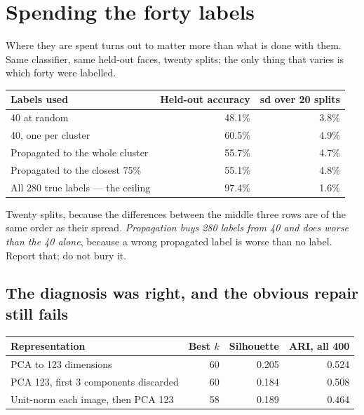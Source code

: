 \documentclass[11pt,a4paper]{article}
\begin{document}
\section{Spending the forty labels}

Where they are spent turns out to matter more than what is done with them. Same
classifier, same held-out faces, twenty splits; the only thing that varies is
which forty were labelled.

\begin{center}
\small
\begin{tabular}{lrr}
\toprule
\textbf{Labels used} & \textbf{Held-out accuracy} & \textbf{sd over 20 splits} \\
\midrule
40 at random                        & 48.1\% & 3.8\% \\
40, one per cluster                 & 60.5\% & 4.9\% \\
Propagated to the whole cluster     & 55.7\% & 4.7\% \\
Propagated to the closest 75\%      & 55.1\% & 4.8\% \\
All 280 true labels --- the ceiling & 97.4\% & 1.6\% \\
\bottomrule
\end{tabular}
\end{center}

Twenty splits, because the differences between the middle three rows are of the
same order as their spread. \emph{Propagation buys 280 labels from 40 and does
worse than the 40 alone}, because a wrong propagated label is worse than no
label. Report that; do not bury it.

\subsection{The diagnosis was right, and the obvious repair still fails}

\begin{center}
\small
\begin{tabular}{lrrr}
\toprule
\textbf{Representation} & \textbf{Best $k$} & \textbf{Silhouette} &
\textbf{ARI, all 400} \\
\midrule
PCA to 123 dimensions & 60 & 0.205 & 0.524 \\
PCA 123, first 3 components discarded & 60 & 0.184 & 0.508 \\
Unit-norm each image, then PCA 123 & 58 & 0.189 & 0.464 \\
\bottomrule
\end{tabular}
\end{center}
\end{document}
